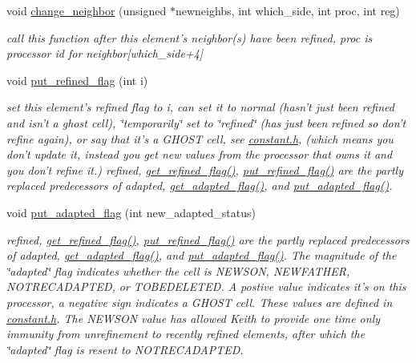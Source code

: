 \begin{CompactItemize}
void \hyperlink{classElement_a35}{change\_\-neighbor} (unsigned $\ast$newneighbs, int which\_\-side, int proc, int reg)
\begin{CompactList}\small\item\em call this function after this element's neighbor(s) have been refined, proc is processor id for neighbor\mbox{[}which\_\-side+4\mbox{]} \item\end{CompactList}\item 
void \hyperlink{classElement_a36}{put\_\-refined\_\-flag} (int i)
\begin{CompactList}\small\item\em set this element's refined flag to i, can set it to normal (hasn't just been refined and isn't a ghost cell), \char`\"{}temporarily\char`\"{} set to \char`\"{}refined\char`\"{} (has just been refined so don't refine again), or say that it's a GHOST cell, see \hyperlink{constant_8h}{constant.h}, (which means you don't update it, instead you get new values from the processor that owns it and you don't refine it.) refined, \hyperlink{classElement_a33}{get\_\-refined\_\-flag()}, \hyperlink{classElement_a36}{put\_\-refined\_\-flag()} are the partly replaced predecessors of adapted, \hyperlink{classElement_a34}{get\_\-adapted\_\-flag()}, and \hyperlink{classElement_a37}{put\_\-adapted\_\-flag()}. \item\end{CompactList}\item 
void \hyperlink{classElement_a37}{put\_\-adapted\_\-flag} (int new\_\-adapted\_\-status)
\begin{CompactList}\small\item\em refined, \hyperlink{classElement_a33}{get\_\-refined\_\-flag()}, \hyperlink{classElement_a36}{put\_\-refined\_\-flag()} are the partly replaced predecessors of adapted, \hyperlink{classElement_a34}{get\_\-adapted\_\-flag()}, and \hyperlink{classElement_a37}{put\_\-adapted\_\-flag()}. The magnitude of the \char`\"{}adapted\char`\"{} flag indicates whether the cell is NEWSON, NEWFATHER, NOTRECADAPTED, or TOBEDELETED. A postive value indicates it's on this processor, a negative sign indicates a GHOST cell. These values are defined in \hyperlink{constant_8h}{constant.h}. The NEWSON value has allowed Keith to provide one time only immunity from unrefinement to recently refined elements, after which the \char`\"{}adapted\char`\"{} flag is resent to NOTRECADAPTED. \item\end{CompactList}\item 

\end{CompactItemize}
